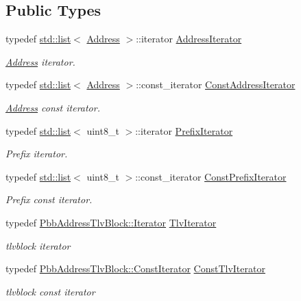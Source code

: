 \subsection*{Public Types}
\begin{DoxyCompactItemize}
\item 
typedef \hyperlink{openflow-interface_8h_afd9bcfa176617760671b67580f536fa7}{std\+::list}$<$ \hyperlink{classns3_1_1Address}{Address} $>$\+::iterator \hyperlink{classns3_1_1PbbAddressBlock_a17f626a1684a378dae2bdf678b042e37}{Address\+Iterator}
\begin{DoxyCompactList}\small\item\em \hyperlink{classns3_1_1Address}{Address} iterator. \end{DoxyCompactList}\item 
typedef \hyperlink{openflow-interface_8h_afd9bcfa176617760671b67580f536fa7}{std\+::list}$<$ \hyperlink{classns3_1_1Address}{Address} $>$\+::const\+\_\+iterator \hyperlink{classns3_1_1PbbAddressBlock_ac1f10df8f85c0c8d4b729352bc32a7cf}{Const\+Address\+Iterator}
\begin{DoxyCompactList}\small\item\em \hyperlink{classns3_1_1Address}{Address} const iterator. \end{DoxyCompactList}\item 
typedef \hyperlink{openflow-interface_8h_afd9bcfa176617760671b67580f536fa7}{std\+::list}$<$ uint8\+\_\+t $>$\+::iterator \hyperlink{classns3_1_1PbbAddressBlock_a0c36abcfa36790bcbd156d036e103fa4}{Prefix\+Iterator}
\begin{DoxyCompactList}\small\item\em Prefix iterator. \end{DoxyCompactList}\item 
typedef \hyperlink{openflow-interface_8h_afd9bcfa176617760671b67580f536fa7}{std\+::list}$<$ uint8\+\_\+t $>$\+::const\+\_\+iterator \hyperlink{classns3_1_1PbbAddressBlock_ac99d39169c106574b8c2aa51646bf404}{Const\+Prefix\+Iterator}
\begin{DoxyCompactList}\small\item\em Prefix const iterator. \end{DoxyCompactList}\item 
typedef \hyperlink{classns3_1_1PbbAddressTlvBlock_a3291c01bdaccabd163f5b65b64c981da}{Pbb\+Address\+Tlv\+Block\+::\+Iterator} \hyperlink{classns3_1_1PbbAddressBlock_a3bd1d32d5fa278168a97ded673ba0fd3}{Tlv\+Iterator}
\begin{DoxyCompactList}\small\item\em tlvblock iterator \end{DoxyCompactList}\item 
typedef \hyperlink{classns3_1_1PbbAddressTlvBlock_a48fa2760ff5fae1a550680b0ace7403b}{Pbb\+Address\+Tlv\+Block\+::\+Const\+Iterator} \hyperlink{classns3_1_1PbbAddressBlock_aade1f33dd044ed386c19efdaf6036e93}{Const\+Tlv\+Iterator}
\begin{DoxyCompactList}\small\item\em tlvblock const iterator \end{DoxyCompactList}\end{DoxyCompactItemize}
